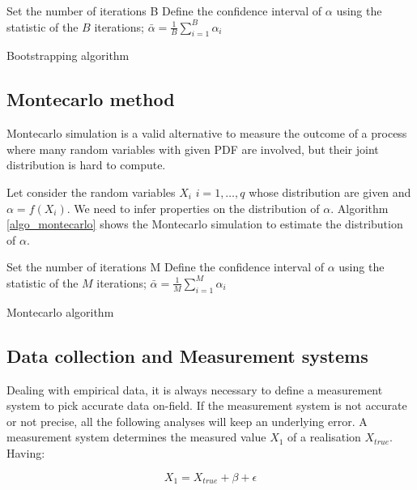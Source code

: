 \begin{algorithm}[H]
\DontPrintSemicolon
\SetAlgoLined
Set the number of iterations B\;
Define the confidence interval of $\alpha$ using the statistic of the $B$ iterations; $\bar{\alpha}=\frac{1}{B}\sum_{i=1}^{B}\alpha_i$ \;
\caption{Bootstrapping algorithm}
\label{algo_bootstrap}
\end{algorithm}

\subsection{Montecarlo method} \label{secMontecarlo}
Montecarlo simulation is a valid alternative to measure the outcome of a process where many random variables with given PDF are involved, but their joint distribution is hard to compute. \par

Let consider the random variables $X_i$ $i=1,\ldots,q$ whose distribution are given and $\alpha=f(X_i)$. We need to infer properties on the distribution of $\alpha$. Algorithm \ref{algo_montecarlo} shows the Montecarlo simulation to estimate the distribution of $\alpha$. 

\begin{algorithm}[H]
\DontPrintSemicolon
\SetAlgoLined
Set the number of iterations M\;
Define the confidence interval of $\alpha$ using the statistic of the $M$ iterations; $\bar{\alpha}=\frac{1}{M}\sum_{i=1}^{M}\alpha_i$ \;
\caption{Montecarlo algorithm}
\label{algo_montecarlo}
\end{algorithm}

\subsection{Data collection and Measurement systems} \label{secMeasurementSystem}
Dealing with empirical data, it is always necessary to define a measurement system to pick accurate data on-field. If the measurement system is not accurate or not precise, all the following analyses will keep an underlying error. A measurement system determines the measured value $X_1$ of a realisation $X_{true}$. Having:

\begin{equation}
X_1=X_{true}+\beta+\epsilon
\label{eq_measurement1}
\end{equation}

